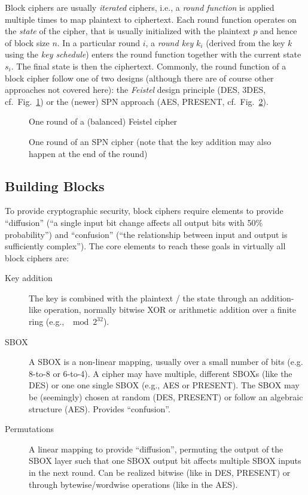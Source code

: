 Block ciphers are usually \emph{iterated} ciphers, i.e., a \emph{round function} is applied multiple times to map plaintext to ciphertext. Each round function operates on the \emph{state} of the cipher, that is usually initialized with the plaintext $p$ and hence of block size $n$. In a particular round $i$, a \emph{round key} $k_i$ (derived from the key $k$ using the \emph{key schedule}) enters the round function together with the current state $s_i$. The final state is then the ciphertext. Commonly, the round function of a block cipher follow one of two designs (although there are of course other approaches not covered here): the \emph{Feistel} design principle (\ac{DES}, \ac{3DES}, cf.~Fig.~\ref{fig:symmetric_crypto:feistel}) or the (newer) \ac{SPN} approach (\ac{AES}, PRESENT, cf.~Fig.~\ref{fig:symmetric_crypto:spn}). 

\begin{figure}[h!tb]
		\center
			
		\caption{One round of a (balanced) Feistel cipher}
		\label{fig:symmetric_crypto:feistel}
\end{figure} 

\begin{figure}[h!tb]
		\center
			
		\caption{One round of an \ac{SPN} cipher (note that the key addition may also happen at the end of the round)}
		\label{fig:symmetric_crypto:spn}
\end{figure} 

\subsection{Building Blocks}
To provide cryptographic security, block ciphers require elements to provide ``diffusion'' (``a single input bit change affects all output bits with 50\% probability'') and ``confusion'' (``the relationship between input and output is sufficiently complex''). The core elements to reach these goals in virtually all block ciphers are:

\begin{description}
  \item[Key addition] The key is combined with the plaintext / the state through an addition-like operation, normally bitwise \ac{XOR} or arithmetic addition over a finite ring (e.g., $\mod 2^{32}$).
	\item[\acs{SBOX}] A \ac{SBOX} is a non-linear mapping, usually over a small number of bits (e.g. 8-to-8 or 6-to-4). A cipher may have multiple, different \acp{SBOX} (like the \ac{DES}) or one one single \ac{SBOX} (e.g., \ac{AES} or PRESENT). The \ac{SBOX} may be (seemingly) chosen at random (\ac{DES}, PRESENT) or follow an algebraic structure (\ac{AES}). Provides ``confusion''.
	\item[Permutations] A linear mapping to provide ``diffusion'', permuting the output of the \ac{SBOX} layer such that one \ac{SBOX} output bit affects multiple \ac{SBOX} inputs in the next round. Can be realized bitwise (like in \ac{DES}, PRESENT) or through bytewise/wordwise operations (like in the \ac{AES}). 
\end{description}


